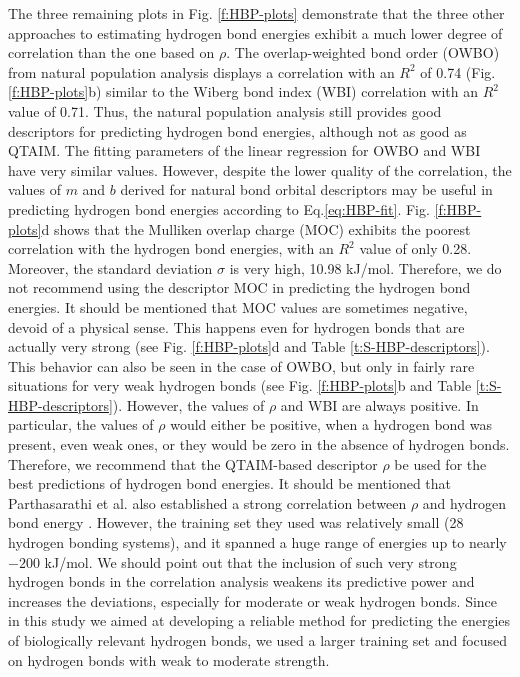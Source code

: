 \documentclass[11pt]{report}
\begin{document}
The three remaining plots in 
Fig. \ref{f:HBP-plots} 
demonstrate
that the three other approaches to estimating hydrogen bond energies exhibit a much lower degree of correlation
than the one based on $\rho$. The overlap-weighted bond order (OWBO) from natural population analysis displays a correlation with an $R^2$ of 0.74 
(Fig. \ref{f:HBP-plots}b) similar to the Wiberg bond index (WBI) correlation with an $R^2$ value of 0.71. Thus, the natural population analysis still provides good descriptors for predicting hydrogen bond energies, although not as good as QTAIM. The fitting parameters of the linear regression for OWBO and WBI have very similar values. However, despite the lower quality of the correlation, the values of $m$ and $b$ derived for natural bond orbital descriptors may be useful in predicting hydrogen bond energies according to 
Eq.\ref{eq:HBP-fit}. 
Fig. \ref{f:HBP-plots}d shows that the Mulliken overlap charge (MOC) exhibits the poorest correlation with the hydrogen bond energies, with an $R^2$ value of only 0.28. Moreover, the standard deviation $\sigma$ is very high, 10.98 kJ/mol. Therefore, we do not recommend using the descriptor MOC in predicting the hydrogen bond energies. It should be mentioned that MOC values are
sometimes negative, devoid of a physical sense. This happens even for hydrogen bonds that are actually very strong (see Fig. 
\ref{f:HBP-plots}d and Table \ref{t:S-HBP-descriptors}). 
This behavior can also be seen in the case of OWBO, but only in fairly rare situations for very weak hydrogen bonds (see Fig. \ref{f:HBP-plots}b and Table \ref{t:S-HBP-descriptors}). 
However, the values of $\rho$ and WBI are always positive. In particular, the values of $\rho$ would either be positive, when a hydrogen bond was present, even weak ones, or they would be zero in the absence of hydrogen bonds. Therefore, we recommend that the QTAIM-based descriptor $\rho$ be used for the best predictions of hydrogen bond energies. It should be mentioned that Parthasarathi et al. also established a strong correlation between $\rho$ and hydrogen bond energy
\cite{Parthasarathi2006}. 
However, the training set they used was relatively small (28 hydrogen bonding systems), and it spanned a huge range of energies up to nearly
$-200$ kJ/mol. We should point out that the inclusion of such very strong hydrogen bonds in the correlation analysis
weakens its predictive power and increases the deviations, especially for moderate or weak hydrogen bonds. Since in this study we aimed at developing a reliable method for predicting the energies of biologically relevant hydrogen bonds, we used a larger training set and focused on hydrogen bonds with weak to moderate strength.
\end{document}
